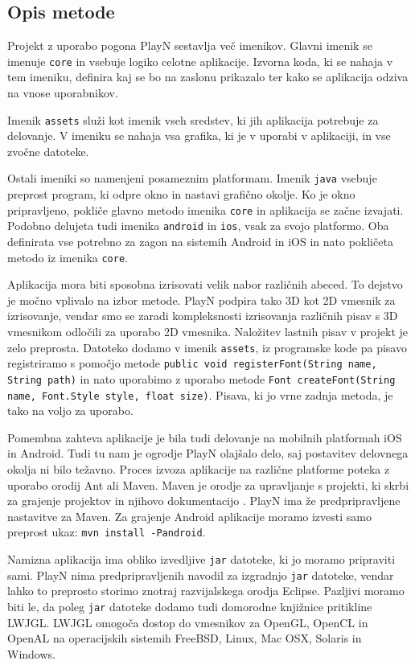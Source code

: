 \subsection{Opis metode}

Projekt z uporabo pogona PlayN sestavlja več imenikov. Glavni imenik se imenuje \texttt{core} in vsebuje logiko celotne aplikacije. Izvorna koda, ki se nahaja v tem imeniku, definira kaj se bo na zaslonu prikazalo ter kako se aplikacija odziva na vnose uporabnikov. 



Imenik \texttt{assets} služi kot imenik vseh sredstev, ki jih aplikacija potrebuje za delovanje. V imeniku se nahaja vsa grafika, ki je v uporabi v aplikaciji, in vse zvočne datoteke.

Ostali imeniki so namenjeni posameznim platformam. Imenik \texttt{java} vsebuje preprost program, ki odpre okno in nastavi grafično okolje. Ko je okno pripravljeno, pokliče glavno metodo imenika \texttt{core} in aplikacija se začne izvajati. Podobno delujeta tudi imenika \texttt{android} in \texttt{ios}, vsak za svojo platformo. Oba definirata vse potrebno za zagon na sistemih Android in iOS in nato pokličeta metodo iz imenika \texttt{core}.

Aplikacija mora biti sposobna izrisovati velik nabor različnih abeced. To dejstvo je močno vplivalo na izbor metode. PlayN podpira tako 3D kot 2D vmesnik za izrisovanje, vendar smo se zaradi kompleksnosti izrisovanja različnih pisav s 3D vmesnikom odločili za uporabo 2D vmesnika. Naložitev lastnih pisav v projekt je zelo preprosta. Datoteko dodamo v imenik \texttt{assets}, iz programske kode pa pisavo registriramo s pomočjo metode \texttt{public void registerFont(String name, String path)} in nato uporabimo z uporabo metode \texttt{Font createFont(String name, Font.Style style, float size)}. Pisava, ki jo vrne zadnja metoda, je tako na voljo za uporabo.

Pomembna zahteva aplikacije je bila tudi delovanje na mobilnih platformah iOS in Android. Tudi tu nam je ogrodje PlayN olajšalo delo, saj postavitev delovnega okolja ni bilo težavno. Proces izvoza aplikacije na različne platforme poteka z uporabo orodij Ant ali Maven. Maven je orodje za upravljanje s projekti, ki skrbi za grajenje projektov in njihovo dokumentacijo \cite{mvn}. PlayN ima že predpripravljene nastavitve za Maven. Za grajenje Android aplikacije moramo izvesti samo preprost ukaz: \texttt{mvn install -Pandroid}. 

Namizna aplikacija ima obliko izvedljive \texttt{jar} datoteke, ki jo moramo pripraviti sami. PlayN nima predpripravljenih navodil za izgradnjo \texttt{jar} datoteke, vendar lahko to preprosto storimo znotraj razvijalskega orodja Eclipse. Pazljivi moramo biti le, da poleg \texttt{jar} datoteke dodamo tudi domorodne knjižnice pritikline LWJGL. LWJGL \cite{lwjgl} omogoča dostop do vmesnikov za OpenGL, OpenCL in OpenAL na operacijskih sistemih FreeBSD, Linux, Mac OSX, Solaris in Windows.


